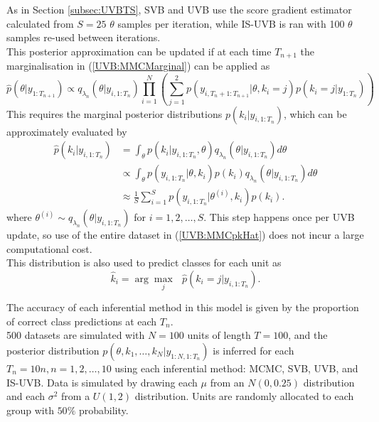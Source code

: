 \documentclass[
12pt, %
onehalfspacing, %
nohyperref, %
headsepline, %
chapterinoneline, %
]{MastersDoctoralThesis} %
\begin{document}
As in Section \ref{subsec:UVBTS}, SVB and UVB use the score gradient estimator calculated from $S = 25$ $\theta$ samples per iteration, while IS-UVB is ran with 100 $\theta$ samples re-used between iterations.
\\

This posterior approximation can be updated if at each time $T_{n+1}$ the marginalisation in (\ref{UVB:MMCMarginal}) can be applied as
\begin{equation}
\label{UVB:MMCUpdate}
\hat{p}(\theta | y_{1:T_{n+1}}) \propto q_{\lambda_{n}}(\theta | y_{i, 1:T_{n}}) \prod_{i=1}^N \left( \sum_{j=1}^2 p(y_{i, T_n+1:T_{n+1}} | \theta, k_i = j) p(k_i = j | y_{1:T_n}) \right)
\end{equation}
This requires the marginal posterior distributions $p(k_i | y_{i, 1:T_{n}})$, which can be  approximately evaluated by
\begin{align}
\hat{p}(k_i | y_{i, 1:T_{n}}) &= \int_{\theta} p(k_i | y_{i, 1:T_{n}}, \theta)q_{\lambda_{n}}(\theta | y_{i, 1:T_{n}}) d\theta \nonumber \\
&\propto \int_{\theta} p(y_{i, 1:T_n} | \theta, k_i) p(k_i) q_{\lambda_{n}}(\theta | y_{i, 1:T_{n}}) d\theta \nonumber \\
&\approx \frac{1}{S} \sum_{i=1}^S p(y_{i, 1:T_n} | \theta^{(i)} , k_i) p(k_i). \label{UVB:MMCpkHat}
\end{align}
where $\theta^{(i)} \sim q_{\lambda_{n}}(\theta | y_{i, 1:T_{n}})$ for $i = 1, 2, \ldots, S$. This step happens once per UVB update, so use of the entire dataset in (\ref{UVB:MMCpkHat}) does not incur a large computational cost.
\\

This distribution is also used to predict classes for each unit as
\begin{equation}
\hat{k}_i = \arg \underset{j}{\max}\mbox{ } \hat{p}(k_i = j | y_{i, 1:T_n}).
\end{equation}

The accuracy of each inferential method in this model is given by the proportion of correct class predictions at each $T_n$.
\\

500 datasets are simulated with $N = 100$ units of length $T = 100$, and the posterior distribution $p(\theta, k_1, \ldots, k_N | y_{1:N, 1:T_n})$ is inferred for each $T_n = 10n, n = 1, 2, \ldots, 10$ using each inferential method: MCMC, SVB, UVB, and IS-UVB. Data is simulated by drawing each $\mu$ from an $N(0, 0.25)$ distribution and each $\sigma^2$ from a $U(1, 2)$ distribution. Units are randomly allocated to each group with $50\%$ probability. 
\\
\end{document}
